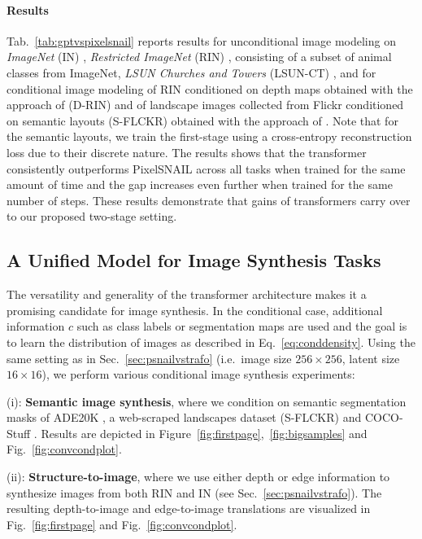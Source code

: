 \documentclass[final]{cvpr}
\begin{document}
\paragraph{Results} Tab.~\ref{tab:gptvspixelsnail} reports results
for unconditional image modeling on \emph{ImageNet} (IN) \cite{deng2009imagenet}, \emph{Restricted ImageNet} (RIN) \cite{santurkar2019computer},
consisting of a subset of animal classes from ImageNet, \emph{LSUN Churches and
Towers} (LSUN-CT) \cite{yu15lsun}, and for conditional image modeling of RIN
conditioned on depth maps obtained with the approach of \cite{Ranftl2020} (D-RIN) and of landscape images
collected from Flickr conditioned on semantic layouts (S-FLCKR) obtained with the
approach of \cite{chen2017deeplab}. Note that for the semantic layouts, we train the
first-stage using a cross-entropy reconstruction loss due to their discrete
nature.
The results shows that the transformer consistently
outperforms PixelSNAIL across all tasks when trained for the same amount of
time and the gap increases even further when trained for the same number of
steps. These results demonstrate that gains of transformers carry over to our
proposed two-stage setting.
\pixelsnailvstransformersmall
%

\subsection{A Unified Model for Image Synthesis Tasks}
\label{sec:four}
%
\firstpagefigurehalf
\noindent
The versatility and generality of the transformer architecture makes it a
promising candidate for image synthesis. In the conditional case, additional
information $c$ such as class labels or segmentation maps are used and the goal
is to learn the distribution of images as described in
Eq.~\eqref{eq:conddensity}. Using the same setting as in
Sec.~\ref{sec:psnailvstrafo} (i.e.\ image size $256 \times 256$, latent size
$16 \times 16$), we perform various conditional image synthesis experiments:
\enlargethispage{1\baselineskip}

\noindent (i): \textbf{Semantic image synthesis}, where we condition on semantic
segmentation masks of ADE20K \cite{zhou2016semantic}, a web-scraped
landscapes dataset (S-FLCKR) and COCO-Stuff \cite{caesar2018cvpr}.
Results are depicted in Figure~\ref{fig:firstpage},~\ref{fig:bigsamples} and Fig.~\ref{fig:convcondplot}.

\noindent (ii): \textbf{Structure-to-image}, where we use either depth or edge
information to synthesize images from both RIN and IN (see
Sec.~\ref{sec:psnailvstrafo}). The resulting depth-to-image and edge-to-image translations
are visualized in Fig.~\ref{fig:firstpage} and Fig.~\ref{fig:convcondplot}.
\end{document}
